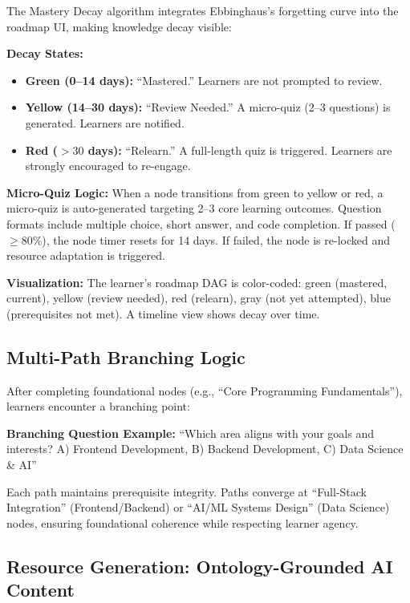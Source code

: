 The Mastery Decay algorithm integrates Ebbinghaus's forgetting curve into the roadmap UI, making knowledge decay visible:

\textbf{Decay States:}
\begin{itemize}
    \item \textbf{Green (0--14 days):} \enquote{Mastered.} Learners are not prompted to review.
    \item \textbf{Yellow (14--30 days):} \enquote{Review Needed.} A micro-quiz (2--3 questions) is generated. Learners are notified.
    \item \textbf{Red ($>30$ days):} \enquote{Relearn.} A full-length quiz is triggered. Learners are strongly encouraged to re-engage.
\end{itemize}

\textbf{Micro-Quiz Logic:} When a node transitions from green to yellow or red, a micro-quiz is auto-generated targeting 2--3 core learning outcomes. Question formats include multiple choice, short answer, and code completion. If passed ($\ge 80\%$), the node timer resets for 14 days. If failed, the node is re-locked and resource adaptation is triggered.

\textbf{Visualization:} The learner's roadmap DAG is color-coded: green (mastered, current), yellow (review needed), red (relearn), gray (not yet attempted), blue (prerequisites not met). A timeline view shows decay over time.

\subsection{Multi-Path Branching Logic}

After completing foundational nodes (e.g., \enquote{Core Programming Fundamentals}), learners encounter a branching point:

\textbf{Branching Question Example:} \enquote{Which area aligns with your goals and interests? A) Frontend Development, B) Backend Development, C) Data Science \& AI}

Each path maintains prerequisite integrity. Paths converge at \enquote{Full-Stack Integration} (Frontend/Backend) or \enquote{AI/ML Systems Design} (Data Science) nodes, ensuring foundational coherence while respecting learner agency.

\subsection{Resource Generation: Ontology-Grounded AI Content}

